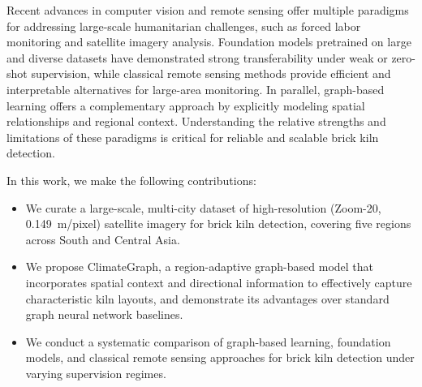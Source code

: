 \documentclass{article}
\theoremstyle{plain}
\theoremstyle{definition}
\theoremstyle{remark}
\begin{document}
Recent advances in computer vision and remote sensing offer multiple paradigms \cite{reed2023scalemae, he2022masked, cong2022satmae} for addressing large-scale humanitarian challenges, such as forced labor monitoring and satellite imagery analysis. Foundation models pretrained on large and diverse datasets have demonstrated strong transferability under weak or zero-shot supervision, while classical remote sensing methods provide efficient and interpretable alternatives for large-area monitoring. In parallel, graph-based learning offers a complementary approach by explicitly modeling spatial relationships and regional context. Understanding the relative strengths and limitations of these paradigms is critical for reliable and scalable brick kiln detection.



In this work, we make the following contributions:
\begin{itemize}
\item We curate a large-scale, multi-city dataset of high-resolution (Zoom-20, 0.149~m/pixel) satellite imagery for brick kiln detection, covering five regions across South and Central Asia.
\item We propose ClimateGraph, a region-adaptive graph-based model that incorporates spatial context and directional information to effectively capture characteristic kiln layouts, and demonstrate its advantages over standard graph neural network baselines.
\item We conduct a systematic comparison of graph-based learning, foundation models, and classical remote sensing approaches for brick kiln detection under varying supervision regimes.
\end{itemize}
\end{document}
